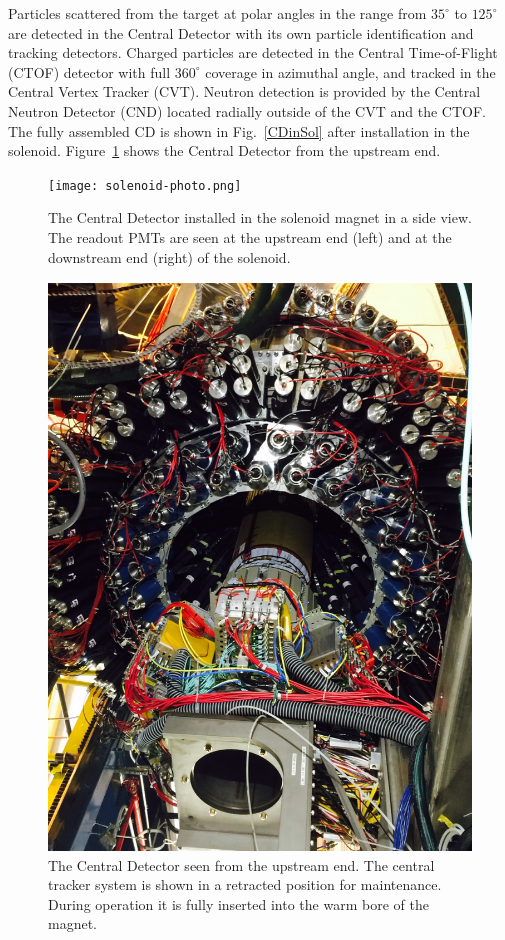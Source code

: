 \documentclass[final,3p,twocolumn]{elsarticle}
\begin{document}
Particles scattered from the target at polar angles in the range from $35^\circ$  to $125^\circ$ are detected in the
Central Detector with its own particle identification and tracking detectors. Charged particles are detected in the
Central Time-of-Flight (CTOF) detector with full $360^\circ$ coverage in azimuthal angle, and tracked in the Central
Vertex Tracker (CVT). Neutron detection is provided by the Central Neutron Detector (CND) located radially outside
of the CVT and the CTOF.  The fully assembled CD is shown in Fig.~\ref{CDinSol} after installation in the solenoid.
Figure~\ref{CDback} shows the Central Detector from the upstream end.

\begin{figure}[thp!]
\centerline{\texttt{[image: solenoid-photo.png]}}
\caption{The Central Detector installed in the solenoid magnet in a side view. The readout PMTs are seen at the
  upstream end (left) and at the downstream end (right) of the solenoid.}
\label{CDinSol}
\centerline{\includegraphics[width=1.0\columnwidth]{CLAS12-CD.png}}
\caption{The Central Detector seen from the upstream end. The central tracker system is shown in a retracted
  position for maintenance. During operation it is fully inserted into the warm bore of the magnet.}
\label{CDback}
\end{figure}
\end{document}
